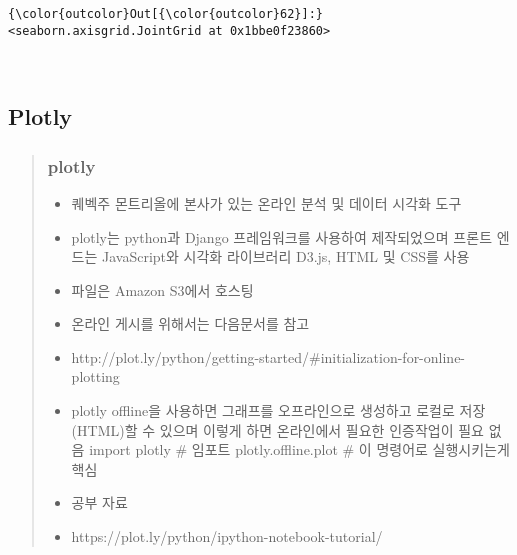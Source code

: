 \documentclass[11pt]{article}
\providecommand{\tightlist}{%
      \setlength{\itemsep}{0pt}\setlength{\parskip}{0pt}}
\begin{document}
\begin{Verbatim}[commandchars=\\\{\}]
{\color{outcolor}Out[{\color{outcolor}62}]:} <seaborn.axisgrid.JointGrid at 0x1bbe0f23860>
\end{Verbatim}
            
    \begin{center}
    \end{center}
    { \hspace*{\fill} \\}
    
    \hypertarget{plotly}{%
\subsection{Plotly}\label{plotly}}

\begin{quote}
\hypertarget{plotly-1}{%
\subsubsection{plotly}\label{plotly-1}}

\begin{itemize}
\tightlist
\item
  퀘벡주 몬트리올에 본사가 있는 온라인 분석 및 데이터 시각화 도구
\item
  plotly는 python과 Django 프레임워크를 사용하여 제작되었으며 프론트
  엔드는 JavaScript와 시각화 라이브러리 D3.js, HTML 및 CSS를 사용
\item
  파일은 Amazon S3에서 호스팅
\item
  온라인 게시를 위해서는 다음문서를 참고
\item
  http://plot.ly/python/getting-started/\#initialization-for-online-plotting
\item
  plotly offline을 사용하면 그래프를 오프라인으로 생성하고 로컬로
  저장(HTML)할 수 있으며 이렇게 하면 온라인에서 필요한 인증작업이 필요
  없음 import plotly \# 임포트 plotly.offline.plot \# 이 명령어로
  실행시키는게 핵심\\
\item
  공부 자료
\item
  https://plot.ly/python/ipython-notebook-tutorial/
\end{itemize}
\end{quote}
\end{document}
